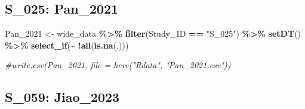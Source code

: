 \documentclass[
]{article}
\newenvironment{Shaded}{\begin{snugshade}}{\end{snugshade}}
\newcommand{\CommentTok}[1]{\textcolor[rgb]{0.56,0.35,0.01}{\textit{#1}}}
\newcommand{\FunctionTok}[1]{\textcolor[rgb]{0.13,0.29,0.53}{\textbf{#1}}}
\newcommand{\NormalTok}[1]{#1}
\newcommand{\OtherTok}[1]{\textcolor[rgb]{0.56,0.35,0.01}{#1}}
\newcommand{\SpecialCharTok}[1]{\textcolor[rgb]{0.81,0.36,0.00}{\textbf{#1}}}
\newcommand{\StringTok}[1]{\textcolor[rgb]{0.31,0.60,0.02}{#1}}
\begin{document}
\subsection{S\_025: Pan\_2021}\label{s_025-pan_2021}

\begin{Shaded}
\begin{Highlighting}[]
\NormalTok{Pan\_2021 }\OtherTok{\textless{}{-}}\NormalTok{ wide\_data }\SpecialCharTok{\%\textgreater{}\%} 
  \FunctionTok{filter}\NormalTok{(Study\_ID }\SpecialCharTok{==} \StringTok{"S\_025"}\NormalTok{) }\SpecialCharTok{\%\textgreater{}\%} 
  \FunctionTok{setDT}\NormalTok{() }\SpecialCharTok{\%\textgreater{}\%}
  \FunctionTok{select\_if}\NormalTok{(}\SpecialCharTok{\textasciitilde{}} \SpecialCharTok{!}\FunctionTok{all}\NormalTok{(}\FunctionTok{is.na}\NormalTok{(.)))}

\CommentTok{\#write.csv(Pan\_2021, file = here("Rdata", "Pan\_2021.csv"))}
\end{Highlighting}
\end{Shaded}

\subsection{S\_059: Jiao\_2023}\label{s_059-jiao_2023}
\end{document}
